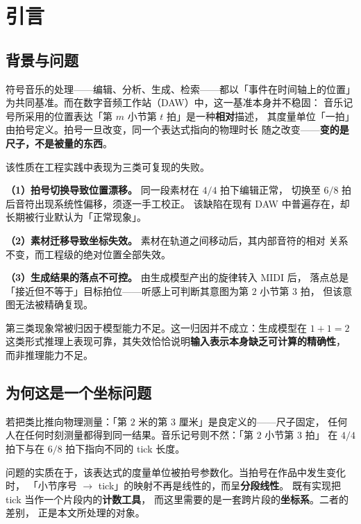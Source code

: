 \documentclass[11pt,a4paper,fontset=none]{ctexart}
\begin{document}

\clearpage

\tableofcontents
\clearpage

\section{引言}
\subsection{背景与问题}

符号音乐的处理——编辑、分析、生成、检索——都以「事件在时间轴上的位置」
为共同基准。而在数字音频工作站（DAW）中，这一基准本身并不稳固：
音乐记号所采用的位置表达「第 $m$ 小节第 $t$ 拍」是一种\textbf{相对}描述，
其度量单位「一拍」由拍号定义。拍号一旦改变，同一个表达式指向的物理时长
随之改变——\textbf{变的是尺子，不是被量的东西}。

该性质在工程实践中表现为三类可复现的失败。

\textbf{（1）拍号切换导致位置漂移。} 同一段素材在 $4/4$ 拍下编辑正常，
切换至 $6/8$ 拍后音符出现系统性偏移，须逐一手工校正。
该缺陷在现有 DAW 中普遍存在，却长期被行业默认为「正常现象」。

\textbf{（2）素材迁移导致坐标失效。} 素材在轨道之间移动后，其内部音符的相对
关系不变，而工程级的绝对位置全部失效。

\textbf{（3）生成结果的落点不可控。} 由生成模型产出的旋律转入 MIDI 后，
落点总是「接近但不等于」目标拍位——听感上可判断其意图为第 $2$ 小节第 $3$ 拍，
但该意图无法被精确复现。

第三类现象常被归因于模型能力不足。这一归因并不成立：生成模型在 $1+1=2$
这类形式推理上表现可靠，其失效恰恰说明\textbf{输入表示本身缺乏可计算的精确性}，
而非推理能力不足。

\subsection{为何这是一个坐标问题}

若把类比推向物理测量：「第 $2$ 米的第 $3$ 厘米」是良定义的——尺子固定，
任何人在任何时刻测量都得到同一结果。音乐记号则不然：「第 $2$ 小节第 $3$ 拍」
在 $4/4$ 拍下与在 $6/8$ 拍下指向不同的 tick 长度。

问题的实质在于，该表达式的度量单位被拍号参数化。当拍号在作品中发生变化时，
「小节序号 $\to$ tick」的映射不再是线性的，而呈\textbf{分段线性}。
既有实现把 tick 当作一个片段内的\textbf{计数工具}，
而这里需要的是一套跨片段的\textbf{坐标系}。二者的差别，
正是本文所处理的对象。
\end{document}
